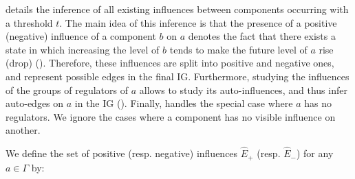  details the inference of all existing influences between components occurring
with a threshold $t$.
The main idea of this inference is that
the presence of a positive (negative) influence of a component $b$ on $a$ denotes the fact that
there exists a state in which increasing the level of $b$ tends to make the future level of $a$ rise (drop)
().
Therefore, these influences are split into positive and negative ones, and represent possible edges in the final IG.
Furthermore, studying the influences of the groups of regulators of $a$
allows to study its auto-influences, and thus infer auto-edges on $a$ in the IG ().
Finally,  handles the special case where $a$ has no regulators.
We ignore the cases where a component has no visible influence on another.
%
\begin{proposition}\label{pps:inference-edges}
We define the set of positive (resp. negative) influences $\hat{E}_+$ (resp. $\hat{E}_-$) for any $a\in\Gamma$ by:
\end{proposition}

